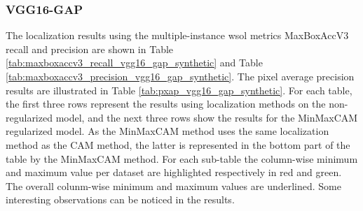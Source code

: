 \subsubsection{VGG16-GAP}
The localization results using the multiple-instance \acrshort{wsol} metrics MaxBoxAccV3 recall and precision are shown in Table \ref{tab:maxboxaccv3_recall_vgg16_gap_synthetic} and Table \ref{tab:maxboxaccv3_precision_vgg16_gap_synthetic}. The pixel average precision results are illustrated in Table \ref{tab:pxap_vgg16_gap_synthetic}. For each table, the first three rows represent the results using localization methods on the non-regularized model, and the next three rows show the results for the MinMaxCAM regularized model. As the MinMaxCAM method uses the same localization method as the CAM method, the latter is represented in the bottom part of the table by the MinMaxCAM method. For each sub-table the column-wise minimum and maximum value per dataset are highlighted respectively in red and green. The overall colunm-wise minimum and maximum values are underlined. Some interesting observations can be noticed in the results.
